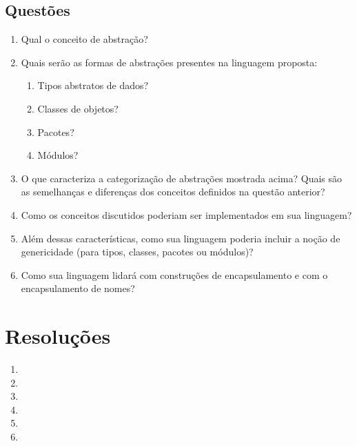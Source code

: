 \documentclass[12pt, a4paper]{article}
\begin{document}
    \subsection{Questões}
    \begin{enumerate}[leftmargin=*]
        \item %
        Qual o conceito de abstração?

        \item %
        Quais serão as formas de abstrações presentes na linguagem proposta:
        \begin{enumerate}
            \item
            Tipos abstratos de dados?

            \item
            Classes de objetos?

            \item
            Pacotes?

            \item
            Módulos?
        \end{enumerate}
        \item %
        O que caracteriza a categorização de abstrações mostrada acima? Quais
        são as semelhanças e diferenças dos conceitos definidos na questão
        anterior?

        \item %
        Como os conceitos discutidos poderiam ser implementados em sua
        linguagem?

        \item %
        Além dessas características, como sua linguagem poderia incluir a noção
        de genericidade (para tipos, classes, pacotes ou módulos)?

        \item %
        Como sua linguagem lidará com construções de encapsulamento e com o
        encapsulamento de nomes?

    \end{enumerate}

\section{Resoluções}
    \begin{enumerate}[leftmargin=*]
        \item
        

        \item
        

        \item
        

        \item
        

        \item
        

        \item
        
    \end{enumerate}
\end{document}
